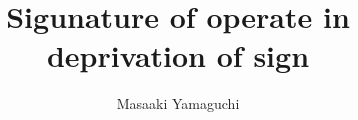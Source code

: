 \documentclass{jsarticle}
\begin{document}
\title{Sigunature of operate in deprivation of sign}
\author{Masaaki Yamaguchi}
\date{}
\maketitle
   \newcommand{\variint}{%
	\begin{picture}(15,30)
		\put(0,0){
			$ \iint $}
		\put(0,5){\line(15,0){15}}
	\end{picture} %
}

\newcommand{\variiint}{%
	\begin{picture}(15,15)
		\put(0,0){
			$ \iiint $}
		\put(0,5){\line(15,0){20}}
	\end{picture} %
}



 \newcommand{\alearletter}{%
	 \begin{picture}(10,20)
		 \put(0,0){
			 $ \square $}
		 \put(0,0){\line(1,1){10}}
	 \end{picture} %
	 }

 \newcommand{\secproduct}{%
	 \begin{picture}(10,20)
		 \put(0,0){
			 $ \nabla $}
		 \put(5,0){+}
	 \end{picture} %
	 }
 \newcommand{\deltasecproduct}{%
	 \begin{picture}(10,20)
		 \put(0,0){
			 $ \Delta $}
		 \put(5,0){+}
	 \end{picture} %
	 }

\newcommand{\timebow}{%
	\begin{picture}(5,5)
		\put(0,0){$\text{\rotatebox{90}{$\bowtie$}}$}
	\end{picture} %
	}
   \newcommand{\squareiint}{%
	\begin{picture}(15,30)
		\put(0,0){
			$ \iint $}
		\put(0,5){$\text{\scalebox{2.0}[1]{$\square$}}$}
	\end{picture} %
}

  
   \newcommand{\dazanier}{%
	\begin{picture}(15,30)
		\put(0,0){
			$ \bigsqcup $}
		\put(4,3){$\text{\scalebox{1.0}[1]{$\top$}}$}
		\put(4,3){$\text{\scalebox{1.0}[1]{$\bot$}}$}
	\end{picture} %
}

  \newcommand{\whitewithbodercircle}
  {\text{\textcircled{\phantom{\textbullet}}}
  \kern-0.9em\text{\textcircled{\phantom{}}}}
     
\end{document}
